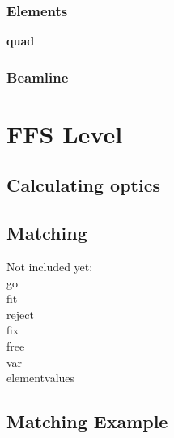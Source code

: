 \documentclass{article}
\begin{document}
\subsubsection{Elements}
\textbf{quad}

\subsubsection{Beamline}


\clearpage

\section{FFS Level}

\subsection{Calculating optics}

\subsection{Matching}


Not included yet:\\
go\\
fit\\
reject\\
fix\\
free\\
var\\

elementvalues\\


\subsection{Matching Example}






\end{document}
